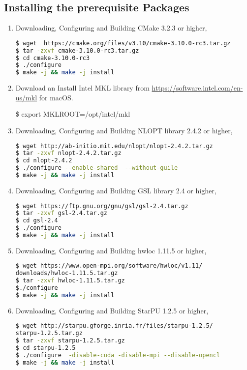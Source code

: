 \documentclass[
10pt, %
a4paper, %
oneside, %
headinclude,footinclude, %
BCOR5mm, %
]{scrartcl}
\begin{document}
\subsection{Installing the prerequisite Packages}
\begin{enumerate}
\item
\noindent Downloading, Configuring and Building CMake 3.2.3 or higher,
\begin{lstlisting}[language=bash]
$ wget  https://cmake.org/files/v3.10/cmake-3.10.0-rc3.tar.gz
$ tar -zxvf cmake-3.10.0-rc3.tar.gz
$ cd cmake-3.10.0-rc3
$ ./configure 
$ make -j && make -j install
\end{lstlisting}

\item

\noindent Download an Install Intel MKL library from \url{https://software.intel.com/en-us/mkl} for macOS.

\noindent \$ export MKLROOT=/opt/intel/mkl

\item
\noindent Downloading, Configuring and Building NLOPT library 2.4.2 or higher,
\begin{lstlisting}[language=bash]
$ wget http://ab-initio.mit.edu/nlopt/nlopt-2.4.2.tar.gz
$ tar -zxvf nlopt-2.4.2.tar.gz
$ cd nlopt-2.4.2
$ ./configure --enable-shared  --without-guile
$ make -j && make -j install
\end{lstlisting}

\item
\noindent Downloading, Configuring and Building GSL library 2.4 or higher,
\begin{lstlisting}[language=bash]
$ wget https://ftp.gnu.org/gnu/gsl/gsl-2.4.tar.gz
$ tar -zxvf gsl-2.4.tar.gz
$ cd gsl-2.4
$ ./configure 
$ make -j && make -j install
\end{lstlisting}

\item
\noindent Downloading, Configuring and Building hwloc 1.11.5 or higher,
\begin{lstlisting}[language=bash]
$ wget https://www.open-mpi.org/software/hwloc/v1.11/
downloads/hwloc-1.11.5.tar.gz
$ tar -zxvf hwloc-1.11.5.tar.gz
$./configure
$ make -j && make -j install
\end{lstlisting}

\item
\noindent Downloading, Configuring and Building StarPU 1.2.5 or higher,
\begin{lstlisting}[language=bash]
$ wget http://starpu.gforge.inria.fr/files/starpu-1.2.5/
starpu-1.2.5.tar.gz
$ tar -zxvf starpu-1.2.5.tar.gz
$ cd starpu-1.2.5
$ ./configure  -disable-cuda -disable-mpi --disable-opencl
$ make -j && make -j install
\end{lstlisting}


\end{enumerate}
\end{document}
